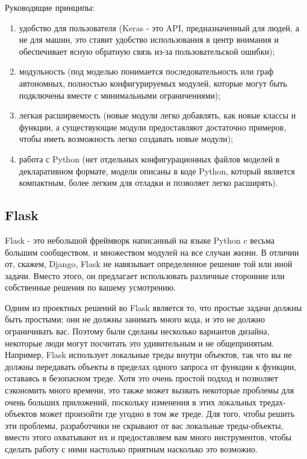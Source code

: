 Руководящие принципы:
\begin{enumerate}
  \item удобство для пользователя (Keras - это API, предназначенный для людей, а не для машин, это ставит удобство использования в центр внимания и обеспечивает ясную обратную связь из-за пользовательской ошибки);
  \item модульность (под моделью понимается последовательность или граф автономных, полностью конфигурируемых модулей, которые могут быть подключены вместе с минимальными ограничениями);
  \item легкая расширяемость (новые модули легко добавлять, как новые классы и функции, а существующие модули предоставляют достаточно примеров, чтобы иметь возможность легко создавать новые модули);
  \item работа с Python (нет отдельных конфигурационных файлов моделей в декларативном формате, модели описаны в коде Python, который является компактным, более легким для отладки и позволяет легко расширять).
\end{enumerate}

\subsection{Flask}
\label{sec:development:flask}

Flask - это небольшой фреймворк написанный на языке Python c весьма большим сообществом, и множеством модулей на все случаи жизни. В отличии от, скажем, Django, Flask не навязывает определенное решение той или иной задачи. Вместо этого, он предлагает использовать различные сторонние или собственные решения по вашему усмотрению.

Одним из проектных решений во Flask является то, что простые задачи должны быть простыми; они не должны занимать много кода, и это не должно ограничивать вас. Поэтому были сделаны несколько вариантов дизайна, некоторые люди могут посчитать это удивительным и не общепринятым. Например, Flask использует локальные треды внутри объектов, так что вы не должны передавать объекты в пределах одного запроса от функции к функции, оставаясь в безопасном треде. Хотя это очень простой подход и позволяет сэкономить много времени, это также может вызвать некоторые проблемы для очень больших приложений, поскольку изменения в этих локальных тредах-объектов может произойти где угодно в том же треде. Для того, чтобы решить эти проблемы, разработчики не скрывают от вас локальные треды-объекты, вместо этого охватывают их и предоставляем вам много инструментов, чтобы сделать работу с ними настолько приятным насколько это возможно.


